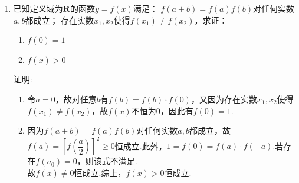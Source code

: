 \begin{enumerate}
\item 已知定义域为$\mathbf{R}$的函数$y = f(x)$满足： $f(a+b) = f(a)f(b)$对任何实数$a, b$都成立；  存在实数$x_1, x_2$使得$f(x_1) \neq f(x_2)$，求证：
\begin{enumerate}
    \item $f(0) = 1$
    \item $f(x) > 0$
\end{enumerate}

\begin{jieda}
证明: 
\begin{enumerate}
    \item 令$a = 0$，故对任意$b$有$f(b) = f(b) \cdot f(0)$，又因为存在实数$x_1, x_2$使得$f(x_1) \neq f(x_2)$，故$f(x)$不恒为0，因此有$f(0) = 1$.
    \item 因为$f(a+b) = f(a)f(b)$对任何实数$a, b $都成立，故$f(a) = [f(\dfrac{a}{2})]^2 \geq 0$恒成立.此外，$1 = f(0) = f(a) \cdot f(-a)$.若存在$f(a_0) = 0$，则该式不满足.\\
    故$f(x) \neq 0$恒成立.综上，$f(x) > 0$恒成立.
\end{enumerate}
\end{jieda} 
\begin{vspace_}
\vsp[6]
\end{vspace_}

\end{enumerate}

